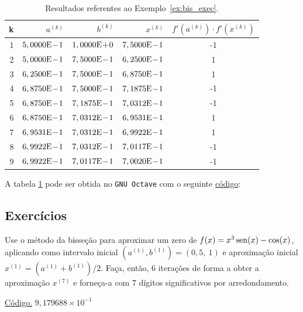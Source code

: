 \begin{table}[h!]
  \centering
  \caption{Resultados referentes ao Exemplo~\ref{ex:bis_exec}.}
  \begin{tabular}{r|rr|r|c}
    k & $a^{(k)}$ & $b^{(k)}$ & $x^{(k)}$ & $f'(a^{(k)})\cdot f'(x^{(k)})$\\\hline
    1 & $5,0000\mathrm{E}\!-\!1$ & $1,0000\mathrm{E}\!+\!0$ & $7,5000\mathrm{E}\!-\!1$ & -1 \\
    2 & $5,0000\mathrm{E}\!-\!1$ & $7,5000\mathrm{E}\!-\!1$ & $6,2500\mathrm{E}\!-\!1$ &  1 \\
    3 & $6,2500\mathrm{E}\!-\!1$ & $7,5000\mathrm{E}\!-\!1$ & $6,8750\mathrm{E}\!-\!1$ &  1 \\
    4 & $6,8750\mathrm{E}\!-\!1$ & $7,5000\mathrm{E}\!-\!1$ & $7,1875\mathrm{E}\!-\!1$ &  -1 \\
    5 & $6,8750\mathrm{E}\!-\!1$ & $7,1875\mathrm{E}\!-\!1$ & $7,0312\mathrm{E}\!-\!1$ &  -1 \\
    6 & $6,8750\mathrm{E}\!-\!1$ & $7,0312\mathrm{E}\!-\!1$ & $6,9531\mathrm{E}\!-\!1$ &  1 \\
    7 & $6,9531\mathrm{E}\!-\!1$ & $7,0312\mathrm{E}\!-\!1$ & $6,9922\mathrm{E}\!-\!1$ & 1 \\
    8 & $6,9922\mathrm{E}\!-\!1$ & $7,0312\mathrm{E}\!-\!1$ & $7,0117\mathrm{E}\!-\!1$ & -1\\
    9 & $6,9922\mathrm{E}\!-\!1$ & $7,0117\mathrm{E}\!-\!1$ & $7,0020\mathrm{E}\!-\!1$ &  -1\\\hline
  \end{tabular}
  \label{tab:bis_multpar}

\ifisoctave
A tabela \ref{tab:bis_multpar} pode ser obtida no \verb+GNU Octave+ com o seguinte \href{https://github.com/phkonzen/notas/blob/master/src/MatematicaNumerica/cap_eq1d/dados/ex_bis_multpar/ex_bis_multpar.m}{código}:

\fi
\end{table}

\subsection*{Exercícios}

\begin{exer}\label{exer:bis_1}
  Use o método da bisseção para aproximar um zero de $f(x)=x^3\operatorname{sen}(x)-\cos(x)$, aplicando como intervalo inicial $(a^{(1)}, b^{(1)}) = (0,5, ~1)$ e aproximação inicial $x^{(1)}=(a^{(1)}+b^{(1)})/2$. Faça, então, $6$ iterações de forma a obter a aproximação $x^{(7)}$ e forneça-a com $7$ dígitos significativos por arredondamento.
\end{exer}
\begin{resp}
    \ifisoctave 
  \href{https://github.com/phkonzen/notas/blob/master/src/MatematicaNumerica/cap_aritm/dados/exer_bis_1/exer_bis_1.m}{Código.} 
  \fi
  $9,179688\times 10^{-1}$
\end{resp}

